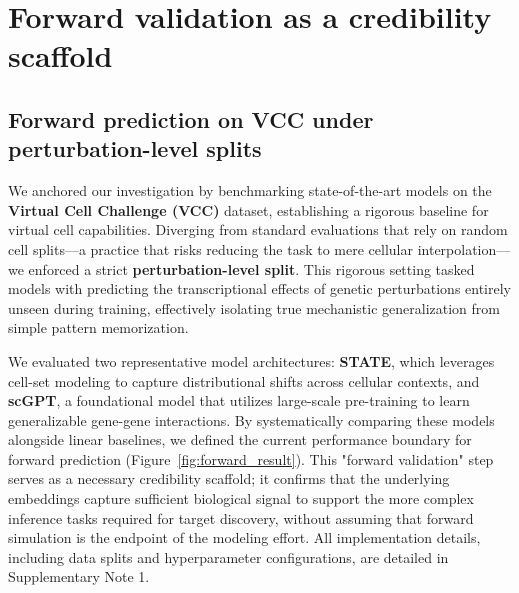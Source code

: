 \documentclass{article}
\begin{document}
\section{Forward validation as a credibility scaffold}

\subsection{Forward prediction on VCC under perturbation-level splits}

We anchored our investigation by benchmarking state-of-the-art models on the \textbf{Virtual Cell Challenge (VCC)} dataset, establishing a rigorous baseline for virtual cell capabilities. Diverging from standard evaluations that rely on random cell splits—a practice that risks reducing the task to mere cellular interpolation—we enforced a strict \textbf{perturbation-level split}. This rigorous setting tasked models with predicting the transcriptional effects of genetic perturbations entirely unseen during training, effectively isolating true mechanistic generalization from simple pattern memorization.

We evaluated two representative model architectures: \textbf{STATE}, which leverages cell-set modeling to capture distributional shifts across cellular contexts, and \textbf{scGPT}, a foundational model that utilizes large-scale pre-training to learn generalizable gene-gene interactions. By systematically comparing these models alongside linear baselines, we defined the current performance boundary for forward prediction (Figure~\ref{fig:forward_result}). This "forward validation" step serves as a necessary credibility scaffold; it confirms that the underlying embeddings capture sufficient biological signal to support the more complex inference tasks required for target discovery, without assuming that forward simulation is the endpoint of the modeling effort. All implementation details, including data splits and hyperparameter configurations, are detailed in Supplementary Note 1.
\end{document}
